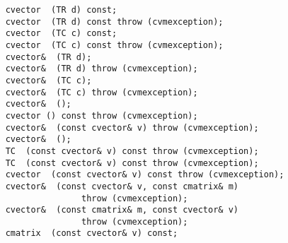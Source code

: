 \verb"    cvector "\verb" (TR d) const;"\\
\verb"    cvector "\verb" (TR d) const throw (cvmexception);"\\
\verb"    cvector "\verb" (TC c) const;"\\
\verb"    cvector "\verb" (TC c) const throw (cvmexception);"\\
\verb"    cvector& "\verb" (TR d);"\\
\verb"    cvector& "\verb" (TR d) throw (cvmexception);"\\
\verb"    cvector& "\verb" (TC c);"\\
\verb"    cvector& "\verb" (TC c) throw (cvmexception);"\\
\verb"    cvector& "\verb" ();"\\
\verb"    cvector "\verb"() const throw (cvmexception);"\\
\verb"    cvector& "\verb" (const cvector& v) throw (cvmexception);"\\
\verb"    cvector& "\verb" ();"\\
\verb"    TC "\verb" (const cvector& v) const throw (cvmexception);"\\
\verb"    TC "\verb" (const cvector& v) const throw (cvmexception);"\\
\verb"    cvector "\verb" (const cvector& v) const throw (cvmexception);"\\
\verb"    cvector& "\verb" (const cvector& v, const cmatrix& m)"\\
\verb"                   throw (cvmexception);"\\
\verb"    cvector& "\verb" (const cmatrix& m, const cvector& v)"\\
\verb"                   throw (cvmexception);"\\
\verb"    cmatrix "\verb" (const cvector& v) const;"\\
